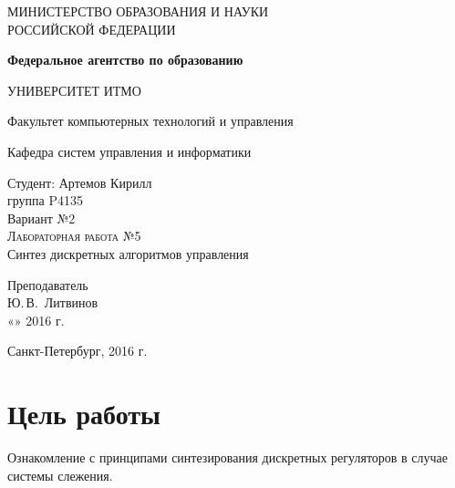 \documentclass[a4paper,14pt]{extreport}
\begin{document}
	
	\begin{titlepage}
		\begin{center}
			\large
			МИНИСТЕРСТВО ОБРАЗОВАНИЯ И НАУКИ\\ РОССИЙСКОЙ ФЕДЕРАЦИИ
			
			\textbf{Федеральное агентство по образованию}
			\vspace{0.5cm}
			
			УНИВЕРСИТЕТ ИТМО
			\vspace{0.25cm}
			
			Факультет компьютерных технологий и управления
			
			Кафедра систем управления и информатики
			\vfill
			
			
			Студент: Артемов Кирилл\\
			группа P4135\\
			Вариант №2\\
			\textsc{Лабораторная работа №5}\\[5mm]
			
			{\LARGE Синтез дискретных алгоритмов управления}
			\bigskip
			
		\end{center}
		\vfill
		
		\newlength{\ML}
		\hfill\begin{minipage}{0.4\textwidth}
			Преподаватель\\
			\underline{\hspace{\ML}} Ю.\,В.~Литвинов\\
			«\underline{\hspace{0.7cm}}» \underline{\hspace{2cm}} 2016 г.
		\end{minipage}%
		\bigskip
		
		\vfill
		
		\begin{center}
			Санкт-Петербург, 2016 г.
		\end{center}
	\end{titlepage}
	\newpage
	
	\section{Цель работы}
	
	Ознакомление с принципами синтезирования дискретных регуляторов в случае системы слежения.
	
\end{document}
